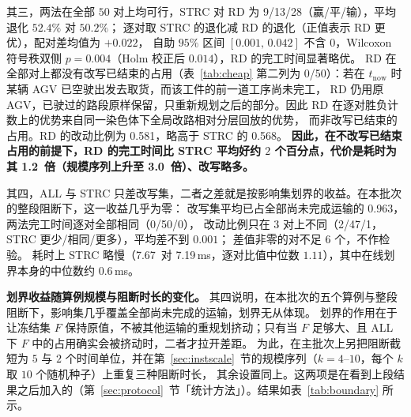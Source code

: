 \documentclass[manuscript,screen,review]{acmart}
\providecommand{\STRC}{\textsc{STRC}}
\newcommand{\NSeeds}{10}
\newcommand{\NPairs}{50}
\newcommand{\MsAllFuture}{7.19}      %
\newcommand{\MsCheapRtwo}{7.67}      %
\newcommand{\RedecodeRatio}{1.2}     %
\newcommand{\RedecodeBad}{0/\NPairs}
\newcommand{\WinVsRedecode}{9/13/28}  %
\newcommand{\WinVsAllFuture}{0/\NPairs/0}  %
\newcommand{\ResFracCheapRtwo}{0.568}
\newcommand{\ResFracRedecode}{0.581}
\newcommand{\RAStabWTL}{2/47/1}      %
\newcommand{\ScaleRatioHi}{3.0}  %
\begin{document}
其三，两法在全部 \(\NPairs\) 对上均可行，\STRC{} 对 RD 为 \WinVsRedecode（赢/平/输），平均退化 \(52.4\%\) 对 \(50.2\%\)；
逐对取 \STRC{} 的退化减 RD 的退化（正值表示 RD 更优），配对差均值为 \(+0.022\)，
自助 \(95\%\) 区间 \([0.001,\,0.042]\) 不含 \(0\)，Wilcoxon 符号秩双侧 \(p=0.004\)（Holm 校正后 \(0.014\)），RD 的完工时间显著略优。
RD 在全部对上都没有改写已结束的占用（表~\ref{tab:cheap} 第二列为 \RedecodeBad）：若在 \(t_{\mathrm{now}}\) 时某辆 AGV 已空驶出发去取货，而该工件的前一道工序尚未完工，
RD 仍用原 AGV，已驶过的路段原样保留，只重新规划之后的部分。因此 RD 在逐对胜负计数上的优势来自同一染色体下全局改路相对分层回放的优势，
而非改写已结束的占用。RD 的改动比例为 \ResFracRedecode，略高于 \STRC{} 的 \ResFracCheapRtwo。
\textbf{因此，在不改写已结束占用的前提下，RD 的完工时间比 \STRC{} 平均好约 \(2\) 个百分点，代价是耗时为其 \RedecodeRatio\ 倍（规模序列上升至 \ScaleRatioHi\ 倍）、改写略多。}

其四，ALL 与 \STRC{} 只差改写集，二者之差就是按影响集划界的收益。在本批次的整段阻断下，这一收益几乎为零：
改写集平均已占全部尚未完成运输的 \(0.963\)，两法完工时间逐对全部相同（\WinVsAllFuture），
改动比例只在 \(3\) 对上不同（\RAStabWTL，\STRC{} 更少/相同/更多），平均差不到 \(0.001\)；
差值非零的对不足 \(6\) 个，不作检验。
耗时上 \STRC{} 略慢（\MsCheapRtwo\ 对 \MsAllFuture\,ms，逐对比值中位数 \(1.11\)），其中在线划界本身的中位数约 \(0.6\)\,ms。

\textbf{划界收益随算例规模与阻断时长的变化。}
其四说明，在本批次的五个算例与整段阻断下，影响集几乎覆盖全部尚未完成的运输，划界无从体现。
划界的作用在于让冻结集 \(F\) 保持原值，不被其他运输的重规划挤动；只有当 \(F\) 足够大、且 ALL 下 \(F\) 中的占用确实会被挤动时，二者才拉开差距。
为此，在主批次上另把阻断截短为 \(5\) 与 \(2\) 个时间单位，并在第~\ref{sec:instscale}~节的规模序列（\(k=4\)--\(10\)，每个 \(k\) 取 \(\NSeeds\) 个随机种子）上重复三种阻断时长，
其余设置同上。这两项是在看到上段结果之后加入的（第~\ref{sec:protocol}~节「统计方法」）。结果如表~\ref{tab:boundary} 所示。
\end{document}
